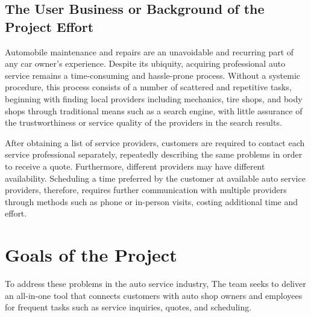 \documentclass[12pt]{article}
\begin{document}
\subsection{The User Business or Background of the Project Effort}
Automobile maintenance and repairs are an unavoidable and recurring part of any
car owner's experience. Despite its ubiquity, acquiring professional auto
service remains a time-consuming and hassle-prone process. Without a systemic
procedure, this process consists of a number of scattered and repetitive tasks,
beginning with finding local providers including mechanics, tire shops, and
body shops through traditional means such as a search engine, with little
assurance of the trustworthiness or service quality of the providers in the
search results.

After obtaining a list of service providers, customers are required to contact
each service professional separately, repeatedly describing the same problems
in order to receive a quote.  Furthermore, different providers may have
different availability. Scheduling a time preferred by the customer at
available auto service providers, therefore, requires further communication
with multiple providers through methods such as phone or in-person visits,
costing additional time and effort.

\section{Goals of the Project}
To address these problems in the auto service industry, The team seeks to deliver
an all-in-one tool that connects customers with auto shop owners and employees for 
frequent tasks such as service inquiries, quotes, and scheduling.
\end{document}
